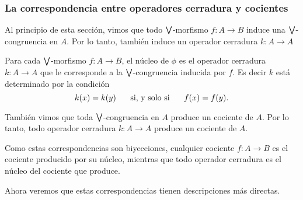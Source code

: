 \subsubsection{La correspondencia entre operadores cerradura y cocientes}

Al principio de esta sección,
vimos que todo $\bigvee$-morfismo $f:A\to B$ induce una
$\bigvee$-congruencia en $A$. Por lo tanto, también induce un
operador cerradura $k:A\to A$

\begin{defn}
    Para cada $\bigvee$-morfismo $f:A\to B$, el núcleo de $\phi$
    es el operador cerradura $k:A\to A$ que le corresponde a
    la $\bigvee$-congruencia inducida por $f$.
    Es decir $k$ está determinado por la condición
    \[
        k(x) = k(y) \hspace{5mm}\text{ si, y solo si }\hspace{5mm} f(x) = f(y)
    .\]
\end{defn}

También vimos que toda $\bigvee$-congruencia en $A$ produce un
cociente de $A$. Por lo tanto, todo operador cerradura $k:A\to A$
produce un cociente de $A$.

Como estas correspondencias son biyecciones,
cualquier cociente $f:A\to B$ es el cociente producido por
su núcleo, mientras que todo operador cerradura es el
núcleo del cociente que produce.

Ahora veremos que estas correspondencias tienen descripciones más
directas.

